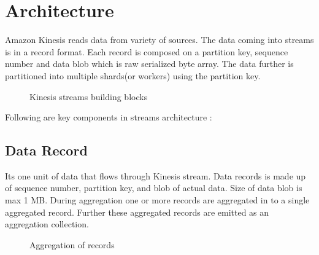 \documentclass[9pt,twocolumn,twoside]{../../styles/osajnl}
\begin{document}
\section{Architecture}
Amazon Kinesis reads data from variety of sources. The data coming into streams
is in a record format. Each record is composed on a partition key, sequence
number and data blob which is raw serialized byte array. The data further is
partitioned into multiple shards(or workers) using the partition key.
\begin{figure}[htbp]
\centering
{}
\caption{Kinesis streams building blocks \cite{www-kinesis-arch}}
\label{fig:false-color}
\end{figure}

Following are key components in streams architecture \cite{www-kinesis-arch} :

\subsection{Data Record}
Its one unit of data that flows through Kinesis stream. Data records is made up
of sequence number, partition key, and blob of actual data. Size of data blob is
max 1 MB. During aggregation one or more records are aggregated in to a single
aggregated record. Further these aggregated records are emitted as an
aggregation collection.

\begin{figure}[htbp]
\centering
{}
\caption{Aggregation of records}
\label{fig:false-color}
\end{figure}
\end{document}
